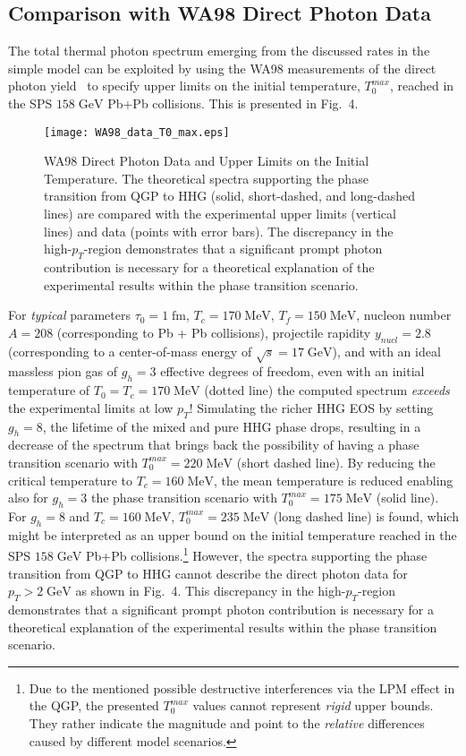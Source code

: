 \documentclass[12pt,twoside,fleqn]{article}
\newcommand{\figcaptionwidth}{15.cm}
\newcommand{\fm}{\mbox{fm}}
\newcommand{\MeV}{\mbox{MeV}}
\newcommand{\GeV}{\mbox{GeV}}
\begin{document}
\subsection{Comparison with WA98 Direct Photon Data}
%
The total thermal photon spectrum emerging from the discussed rates in the
simple model can be exploited by using the WA98 measurements of the direct
photon yield~\cite{WA98_2000} to specify upper limits on the initial
temperature, $T_0^{max}$, reached in the SPS $158\;\GeV$ Pb+Pb collisions. This
is presented in Fig.~4.
\begin{figure}
  \texttt{[image: WA98\_data\_T0\_max.eps]}
  \parbox{\figcaptionwidth}{\caption[WA98 Direct Photon Data and Upper Limits on
    the Initial Temperature] {WA98 Direct Photon Data and Upper Limits on the
      Initial Temperature. The theoretical spectra supporting the phase
      transition from QGP to HHG (solid, short-dashed, and long-dashed lines)
      are compared with the experimental upper limits (vertical lines) and data
      (points with error bars). The discrepancy in the high-$p_T$-region
      demonstrates that a significant prompt photon contribution is necessary
      for a theoretical explanation of the experimental results within the phase
      transition scenario.}}
\label{Fig_WA98_data_T0_max}
\end{figure} 
%
For {\em typical} parameters 
%
$\tau_0 = 1\;\fm$, $T_c = 170\;\MeV$, $T_f = 150\;\MeV$, 
%
nucleon number $A=208$ (corresponding to Pb + Pb collisions), projectile
rapidity $y_{nucl}=2.8$ (corresponding to a center-of-mass energy of
$\sqrt{s}=17\;\GeV$), and with an ideal massless pion gas of $g_h = 3$ effective
degrees of freedom, even with an initial temperature of $T_0 = T_c = 170\;\MeV$
(dotted line) the computed spectrum {\em exceeds} the experimental limits at low
$p_T$! Simulating the richer HHG EOS by setting $g_h = 8$, the lifetime of the
mixed and pure HHG phase drops, resulting in a decrease of the spectrum that
brings back the possibility of having a phase transition scenario with
$T_0^{max}=220\;\MeV$ (short dashed line).  By reducing the critical temperature
to $T_c = 160\;\MeV$, the mean temperature is reduced enabling also for $g_h =
3$ the phase transition scenario with $T_0^{max}=175\;\MeV$ (solid line). For
$g_h = 8$ and $T_c = 160\;\MeV$, $T_0^{max}=235\;\MeV$ (long dashed line) is
found, which might be interpreted as an upper bound on the initial temperature
reached in the SPS $158\;\GeV$ Pb+Pb collisions.\footnote{Due to the mentioned
  possible destructive interferences via the LPM effect in the QGP, the
  presented $T_0^{max}$ values cannot represent {\em rigid} upper bounds. They
  rather indicate the magnitude and point to the {\em relative} differences
  caused by different model scenarios.}  However, the spectra supporting the
phase transition from QGP to HHG cannot describe the direct photon data for $p_T
> 2\;\GeV$ as shown in Fig.~4. This discrepancy in the high-$p_T$-region
demonstrates that a significant prompt photon contribution is necessary for a
theoretical explanation of the experimental results within the phase transition
scenario.
%
\end{document}
